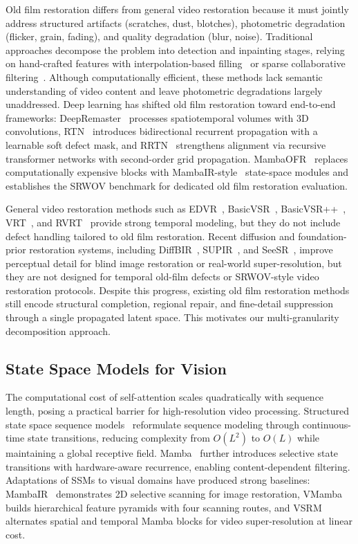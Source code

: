 \documentclass[symmetry,article,submit,pdftex,moreauthors]{Definitions/mdpi}
\begin{document}
Old film restoration differs from general video restoration because it must jointly address structured artifacts (scratches, dust, blotches), photometric degradation (flicker, grain, fading), and quality degradation (blur, noise). Traditional approaches decompose the problem into detection and inpainting stages, relying on hand-crafted features with interpolation-based filling~\cite{kokaram2004missing} or sparse collaborative filtering~\cite{dabov2007bm3d,he2013guided}. Although computationally efficient, these methods lack semantic understanding of video content and leave photometric degradations largely unaddressed. Deep learning has shifted old film restoration toward end-to-end frameworks: DeepRemaster~\cite{iizuka2019deepremaster} processes spatiotemporal volumes with 3D convolutions, RTN~\cite{wan2022rtn} introduces bidirectional recurrent propagation with a learnable soft defect mask, and RRTN~\cite{lin2024rrtn} strengthens alignment via recursive transformer networks with second-order grid propagation. MambaOFR~\cite{mao2025mambaofr} replaces computationally expensive blocks with MambaIR-style~\cite{guo2024mambair} state-space modules and establishes the SRWOV benchmark for dedicated old film restoration evaluation.

General video restoration methods such as EDVR~\cite{wang2019edvr}, BasicVSR~\cite{chan2021basicvsr}, BasicVSR++~\cite{chan2022basicvsrpp}, VRT~\cite{liang2024vrt}, and RVRT~\cite{liang2022rvrt} provide strong temporal modeling, but they do not include defect handling tailored to old film restoration. Recent diffusion and foundation-prior restoration systems, including DiffBIR~\cite{lin2024diffbir}, SUPIR~\cite{yu2024supir}, and SeeSR~\cite{wu2024seesr}, improve perceptual detail for blind image restoration or real-world super-resolution, but they are not designed for temporal old-film defects or SRWOV-style video restoration protocols. Despite this progress, existing old film restoration methods still encode structural completion, regional repair, and fine-detail suppression through a single propagated latent space. This motivates our multi-granularity decomposition approach.

\subsection{State Space Models for Vision}
\label{subsec:ssm}

The computational cost of self-attention scales quadratically with sequence length, posing a practical barrier for high-resolution video processing. Structured state space sequence models~\cite{gu2022s4} reformulate sequence modeling through continuous-time state transitions, reducing complexity from $O(L^2)$ to $O(L)$ while maintaining a global receptive field. Mamba~\cite{gu2024mamba} further introduces selective state transitions with hardware-aware recurrence, enabling content-dependent filtering. Adaptations of SSMs to visual domains have produced strong baselines: MambaIR~\cite{guo2024mambair} demonstrates 2D selective scanning for image restoration, VMamba~\cite{liu2024vmamba} builds hierarchical feature pyramids with four scanning routes, and VSRM~\cite{tran2025vsrm} alternates spatial and temporal Mamba blocks for video super-resolution at linear cost.
\end{document}
